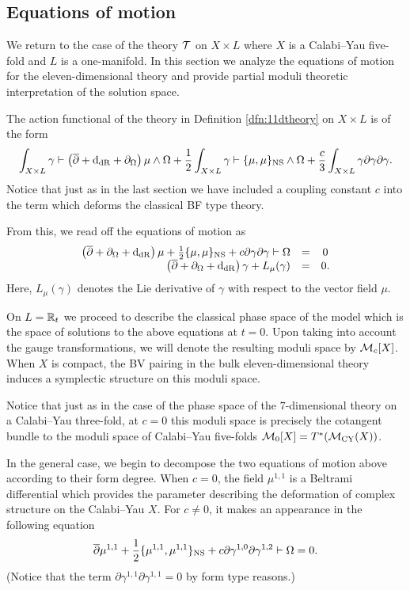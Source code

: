 \documentclass[11pt]{amsart}
\begin{document}
\subsection{Equations of motion}
\label{sec:org2973a4d}
We return to the case of the theory $\mathcal T$ on $X\times L$ where $X$ is a Calabi--Yau five-fold and $L$ is a one-manifold.
In this section we analyze the equations of motion for the eleven-dimensional theory and provide partial moduli theoretic interpretation of the solution space.

The action functional of the theory in Definition \ref{dfn:11dtheory} on $X \times L$ is of the form
\[
  \int_{X \times L} \gamma \vdash \left(\overline{\partial} + {\rm d}_{\rm dR} + \partial_{\Omega}\right) \mu \wedge \Omega + \frac12 \int_{X \times L} \gamma \vdash \{\mu,\mu\}_{\rm NS} \wedge \Omega + \frac{c}{3} \int_{X \times L} \gamma \partial \gamma \partial \gamma .
\]
Notice that just as in the last section we have included a coupling constant $c$ into the term which deforms the classical BF type theory.

From this, we read off the equations of motion as
\begin{equation}\label{eqn:eom}
  \begin{array}{rccc}
    \left(\overline{\partial} + \partial_\Omega + {\rm d}_{\rm dR} \right) \mu + \frac12 \{\mu, \mu\}_{\rm NS} + c \partial \gamma \partial \gamma \vdash \Omega & = & 0 \\
    \left(\overline{\partial} + \partial_\Omega + {\rm d}_{\rm dR} \right) \gamma + L_\mu (\gamma) & = & 0 .
  \end{array}
\end{equation}
Here, $L_\mu(\gamma)$ denotes the Lie derivative of $\gamma$ with respect to the vector field $\mu$.

On $L = \mathbb R_t$ we proceed to describe the classical phase space of the model  which is the space of solutions to the above equations at $t = 0$.
Upon taking into account the gauge transformations, we will denote the resulting moduli space by $\mathcal M_c[X]$.
When $X$ is compact, the BV pairing in the bulk eleven-dimensional theory induces a symplectic structure on this moduli space.

Notice that just as in the case of the phase space of the $7$-dimensional theory on a Calabi--Yau three-fold, at $c=0$ this moduli space is precisely the cotangent bundle to the moduli space of Calabi--Yau five-folds $\mathcal M_0 [X] = T^*(\mathcal M_{\rm CY}(X))$.

In the general case, we begin to decompose the two equations of motion above according to their form degree.
When $c = 0$, the field $\mu^{1,1}$ is a Beltrami differential which provides the parameter describing the deformation of complex structure on the Calabi--Yau $X$.
For $c \ne 0$, it makes an appearance in the following equation
\begin{equation}\label{eqn:mu11}
  \overline{\partial} \mu^{1,1} + \frac12 \{\mu^{1,1}, \mu^{1,1}\}_{\rm NS} + c \partial \gamma^{1,0} \partial \gamma^{1,2} \vdash \Omega = 0 .
\end{equation}
(Notice that the term $\partial \gamma^{1,1} \partial \gamma^{1,1} = 0$ by form type reasons.)
\end{document}
